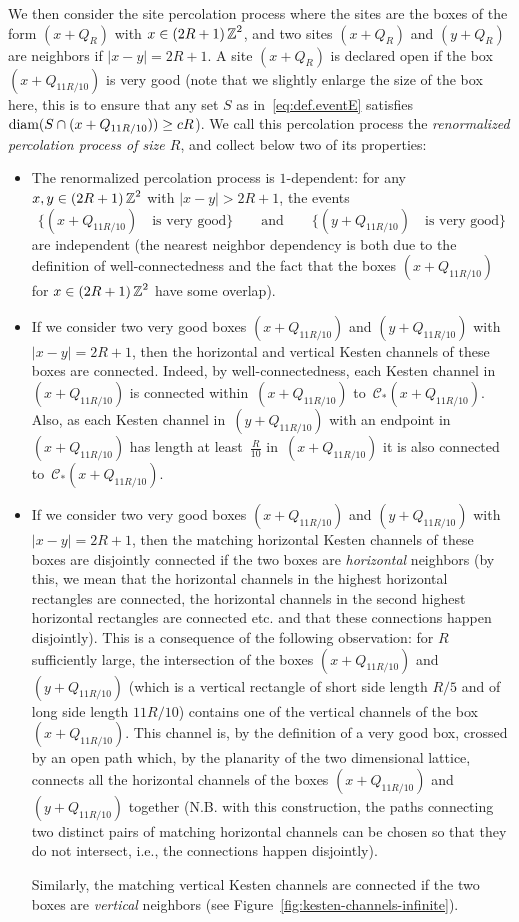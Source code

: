 \documentclass[12pt]{amsart}
\numberwithin{equation}{section}
\begin{document}
	We then consider the site percolation process where the sites are the boxes of the form $(x + Q_R)$ with $x \in (2R + 1) \operatorname{\mathbb{Z}}^2$, and two sites $(x + Q_R)$ and $(y + Q_R)$ are neighbors if $|x - y| = 2R + 1$. A site $(x + Q_R)$ is declared open if the box $(x + Q_{11R/10})$ is very good (note that we slightly enlarge the size of the box here, this is to ensure that any set $S$ as in~\eqref{eq:def.eventE} satisfies $\operatorname{{\mbox{diam}}} (S \cap (x + Q_{11R/10})) \geq c R$). We call this percolation process the \emph{renormalized percolation process of size $R$}, and collect below two of its properties:
	\begin{itemize}
		\item The renormalized percolation process is $1$-dependent: for any $x , y \in (2R + 1) \operatorname{\mathbb{Z}}^2$ with $|x - y| > 2R + 1$, the events 
		\[
		\{ (x + Q_{11R/10}) \quad \mbox{is very good} \} \qquad \mbox{and} \qquad     \{ (y + Q_{11R/10}) \quad \mbox{is very good} \}
		\]
		are independent (the nearest neighbor dependency is both due to the definition of well-connectedness and the fact that the boxes $(x + Q_{11R/10})$ for $x \in (2R+1)\operatorname{\mathbb{Z}}^2$ have some overlap).
		\item If we consider two very good boxes $(x + Q_{11R/10})$ and $(y + Q_{11R/10})$ with $|x - y| = 2R +1$, then the horizontal and vertical Kesten channels of these boxes are connected.
		Indeed, by well-connectedness, each Kesten channel in~$(x+Q_{11R/10})$ is connected within~$(x+Q_{11R/10})$ to~$\mathscr{C}_{*}(x+Q_{11R/10})$. Also, as each Kesten channel in~$(y + Q_{11R/10})$ with an endpoint in $(x+ Q_{11R/10})$ has length at least~$\frac{R}{10}$ in~$(x+ Q_{11R/10})$ it is also connected to~$\mathscr{C}_{*}(x+Q_{11R/10})$. 
		\item If we consider two very good boxes $(x + Q_{11R/10})$ and $(y + Q_{11R/10})$ with $|x - y| = 2R +1$, then the matching horizontal Kesten channels of these boxes are disjointly connected if the two boxes are \emph{horizontal} neighbors (by this, we mean that the horizontal channels in the highest horizontal rectangles are connected, the horizontal channels in the second highest horizontal rectangles are connected etc. and that these connections happen disjointly). This is a consequence of the following observation: for $R$ sufficiently large, the intersection of the boxes $(x + Q_{11R/10})$ and $(y + Q_{11R/10})$ (which is a vertical rectangle of short side length $R/5$ and of long side length $11R/10$) contains one of the vertical channels of the box $(x + Q_{11R/10})$. This channel is, by the definition of a very good box, crossed by an open path which, by the planarity of the two dimensional lattice, connects all the horizontal channels of the boxes $(x + Q_{11R/10})$ and $(y + Q_{11R/10})$ together (N.B. with this construction, the paths connecting two distinct pairs of matching horizontal channels can be chosen so that they do not intersect, i.e., the connections happen disjointly).
		
		Similarly, the matching vertical Kesten channels are connected if the two boxes are \emph{vertical} neighbors (see Figure~\ref{fig:kesten-channels-infinite}).
	\end{itemize}
	
\end{document}
